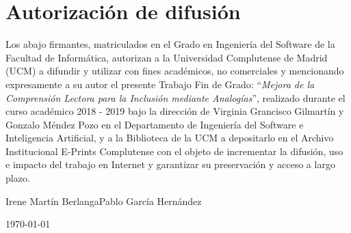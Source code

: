 \chapter*{Autorización de difusión}

   
Los abajo firmantes, matriculados en el Grado en Ingeniería del Software de la Facultad de Informática, autorizan a la Universidad Complutense de Madrid (UCM) a difundir y utilizar con fines académicos, no comerciales y mencionando expresamente a su autor el presente Trabajo Fin de Grado: ``\textit{Mejora de la Comprensión Lectora para la Inclusión mediante Analogías}'', realizado durante el curso académico 2018 - 2019 bajo la dirección de Virginia Grancisco Gilmartín y Gonzalo Méndez Pozo en el Departamento de Ingeniería del Software e Inteligencia Artificial, y a la Biblioteca de la UCM a depositarlo en el Archivo Institucional E-Prints Complutense con el objeto de incrementar la difusión, uso e impacto del trabajo en Internet y garantizar su preservación y acceso a largo plazo.

\vspace{5cm}

\begin{center}
	\large Irene Martín Berlanga\hspace{2cm}Pablo García Hernández\\
	
	\vspace{0.5cm}
	
	
	\today\\
	
\end{center}
